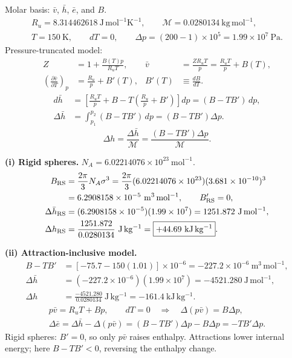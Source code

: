 Molar basis: $\bar v$, $\bar h$, $\bar e$, and $B$.
\begin{gather*}
R_u=8.314462618\ \mathrm{J\,mol^{-1}K^{-1}},\qquad
\mathcal M=0.0280134\ \mathrm{kg\,mol^{-1}},\\
T=150\ \mathrm K,\qquad dT=0,\qquad
\Delta p=(200-1)\times10^5=1.99\times10^7\ \mathrm{Pa}.
\end{gather*}
Pressure-truncated model:
\begin{align*}
Z&=1+\frac{B(T)p}{R_uT},
&\bar v&=\frac{ZR_uT}{p}=\frac{R_uT}{p}+B(T),\\
\left(\frac{\partial\bar v}{\partial T}\right)_p
&=\frac{R_u}{p}+B'(T),
&B'(T)&\equiv\frac{dB}{dT}.
\end{align*}
\begin{align*}
d\bar h
&=\left[\frac{R_uT}{p}+B
-T\left(\frac{R_u}{p}+B'\right)\right]dp
=(B-TB')\,dp,\\
\Delta\bar h&=\int_{p_1}^{p_2}(B-TB')\,dp=(B-TB')\Delta p.
\end{align*}
\[
\boxed{\Delta h=\frac{\Delta\bar h}{\mathcal M}
=\frac{(B-TB')\Delta p}{\mathcal M}.}
\]

\textbf{(i) Rigid spheres.}
$N_A=6.02214076\times10^{23}\ \mathrm{mol^{-1}}$.
\begin{align*}
B_{\rm RS}
&=\frac{2\pi}{3}N_A\sigma^3
=\frac{2\pi}{3}(6.02214076\times10^{23})(3.681\times10^{-10})^3\\
&=6.2908158\times10^{-5}\ \mathrm{m^3\,mol^{-1}},
\qquad B'_{\rm RS}=0,\\
\Delta\bar h_{\rm RS}
&=(6.2908158\times10^{-5})(1.99\times10^7)
=1251.872\ \mathrm{J\,mol^{-1}},\\
\Delta h_{\rm RS}
&=\frac{1251.872}{0.0280134}\ \mathrm{J\,kg^{-1}}
=\boxed{+44.69\ \mathrm{kJ\,kg^{-1}}}.
\end{align*}

\textbf{(ii) Attraction-inclusive model.}
\begin{align*}
B-TB'&=[-75.7-150(1.01)]\times10^{-6}
=-227.2\times10^{-6}\ \mathrm{m^3\,mol^{-1}},\\
\Delta\bar h&=(-227.2\times10^{-6})(1.99\times10^7)
=-4521.280\ \mathrm{J\,mol^{-1}},\\
\Delta h&=\frac{-4521.280}{0.0280134}\ \mathrm{J\,kg^{-1}}
=\boxed{-161.4\ \mathrm{kJ\,kg^{-1}}}.
\end{align*}
\begin{gather*}
p\bar v=R_uT+Bp,\qquad dT=0
\quad\Longrightarrow\quad\Delta(p\bar v)=B\Delta p,\\
\Delta\bar e=\Delta\bar h-\Delta(p\bar v)
=(B-TB')\Delta p-B\Delta p=-TB'\Delta p.
\end{gather*}
Rigid spheres: $B'=0$, so only $p\bar v$ raises enthalpy.
Attractions lower internal energy; here $B-TB'<0$, reversing the enthalpy change.


